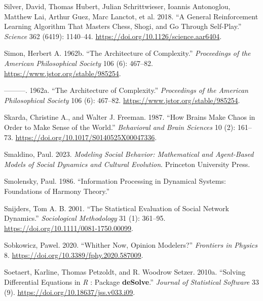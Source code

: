 \documentclass[
  a4paper,
  DIV=11,
  numbers=noendperiod]{scrreprt}
\newlength{\cslhangindent}
\newlength{\cslentryspacingunit} %
\newenvironment{CSLReferences}[2] %
 {%
  \setlength{\parindent}{0pt}
  \ifodd #1
  \let\oldpar\par
  \def\par{\hangindent=\cslhangindent\oldpar}
  \fi
  \setlength{\parskip}{#2\cslentryspacingunit}
 }%
 {}
\begin{document}
\begin{CSLReferences}{1}{0}
\leavevmode{}%
Silver, David, Thomas Hubert, Julian Schrittwieser, Ioannis Antonoglou,
Matthew Lai, Arthur Guez, Marc Lanctot, et al. 2018. {``A General
Reinforcement Learning Algorithm That Masters Chess, Shogi, and {Go}
Through Self-Play.''} \emph{Science} 362 (6419): 1140--44.
\url{https://doi.org/10.1126/science.aar6404}.

\leavevmode{}%
Simon, Herbert A. 1962b. {``The {Architecture} of {Complexity}.''}
\emph{Proceedings of the American Philosophical Society} 106 (6):
467--82. \url{https://www.jstor.org/stable/985254}.

\leavevmode{}%
---------. 1962a. {``The Architecture of Complexity.''}
\emph{Proceedings of the American Philosophical Society} 106 (6):
467--82. \url{https://www.jstor.org/stable/985254}.

\leavevmode{}%
Skarda, Christine A., and Walter J. Freeman. 1987. {``How Brains Make
Chaos in Order to Make Sense of the World.''} \emph{Behavioral and Brain
Sciences} 10 (2): 161--73.
\url{https://doi.org/10.1017/S0140525X00047336}.

\leavevmode{}%
Smaldino, Paul. 2023. \emph{Modeling Social Behavior: Mathematical and
Agent-Based Models of Social Dynamics and Cultural Evolution}. Princeton
University Press.

\leavevmode{}%
Smolensky, Paul. 1986. {``Information {Processing} in {Dynamical
Systems}: {Foundations} of {Harmony Theory}.''}

\leavevmode{}%
Snijders, Tom A. B. 2001. {``The {Statistical Evaluation} of {Social
Network Dynamics}.''} \emph{Sociological Methodology} 31 (1): 361--95.
\url{https://doi.org/10.1111/0081-1750.00099}.

\leavevmode{}%
Sobkowicz, Pawel. 2020. {``Whither {Now}, {Opinion Modelers}?''}
\emph{Frontiers in Physics} 8.
\url{https://doi.org/10.3389/fphy.2020.587009}.

\leavevmode{}%
Soetaert, Karline, Thomas Petzoldt, and R. Woodrow Setzer. 2010a.
{``Solving {Differential Equations} in {\emph{R}} : {Package}
{\textbf{deSolve}}.''} \emph{Journal of Statistical Software} 33 (9).
\url{https://doi.org/10.18637/jss.v033.i09}.


\end{CSLReferences}
\end{document}
